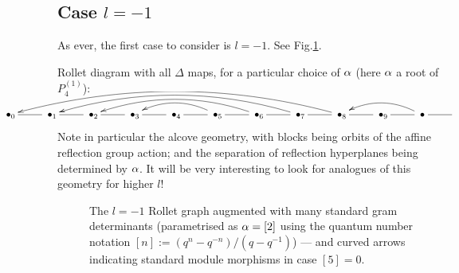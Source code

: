 \subsection{Case $l=-1$}

As ever, the first case to consider is $l=-1$.  See Fig.\ref{fig:gramdets03}. 

\medskip 



Rollet diagram with all $\Delta$ maps, for a particular choice of $\alpha$ 
(here $\alpha$ a root of $P^{(1)}_4$):   %

\[
\hspace{-2.1cm} 
\xymatrix{
   \;\bullet_0 \ar@{-}[r] &  
   \;\bullet_1 \ar@{-}[r] &  
   \;\bullet_2 \ar@{-}[r] &  
   \;\bullet_3 \ar@{-}[r] &  
   \;\bullet_4 \ar@{-}[r] &  
   \;\bullet_5 \ar@{-}[r] \ar@[red]@/_1pc/[ll] &  
   \;\bullet_6 \ar@{-}[r] \ar@[red]@/_1.3pc/[llll] &  
   \;\bullet_7 \ar@{-}[r] \ar@[red]@/_1.653pc/[llllll] &  
   \;\bullet_8 \ar@{-}[r] \ar@[red]@/_1.9653pc/[llllllll] &  
   \;\bullet_9 \ar@{-}[r] &  
   \;\bullet_{} \ar@{-}[r] \ar@[red]@/_1pc/[ll] &  
   }
\]
Note in particular the alcove geometry, with blocks being orbits of the affine reflection group action; and the separation of reflection hyperplanes being determined by $\alpha$.
It will be very interesting to look for analogues of this geometry for higher $l$! 
   

\begin{figure} 

\caption{The $l=-1$ Rollet graph augmented with many standard gram determinants (parametrised as $\alpha=[2]$ using the quantum number notation $[n]:=(q^n-q^{-n})/(q-q^{-1})$) --- 
and curved arrows indicating standard module morphisms in case $[5]=0$. 
\label{fig:gramdets03}}
\end{figure}


\newpage 





